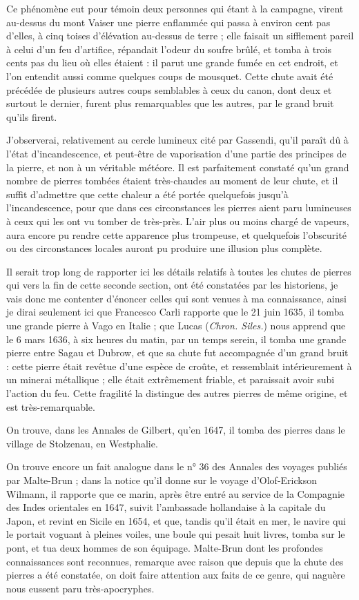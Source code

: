 \documentclass[a4paper, 12pt, oneside, french]{article}
\begin{document}
Ce phénomène eut pour témoin deux personnes qui étant à la campagne, virent au-dessus du mont Vaiser une pierre enflammée qui passa à environ cent pas d'elles, à cinq toises d'élévation au-dessus de terre ; elle faisait un sifflement pareil à celui d'un feu d'artifice, répandait l'odeur du soufre brûlé, et tomba à trois cents pas du lieu où elles étaient : il parut une grande fumée en cet endroit, et l'on entendit aussi comme quelques coups de mousquet. Cette chute avait été précédée de plusieurs autres coups semblables à ceux du canon, dont deux et surtout le dernier, furent plus remarquables que les autres, par le grand bruit qu'ils firent.

J'observerai, relativement au cercle lumineux cité par Gassendi, qu'il paraît dû à l'état d'incandescence, et peut-être de vaporisation d'une partie des principes de la pierre, et non à un véritable météore. Il est parfaitement constaté qu'un grand nombre de pierres tombées étaient très-chaudes au moment de leur chute, et il suffit d'admettre que cette chaleur a été portée quelquefois jusqu'à l'incandescence, pour que dans ces circonstances les pierres aient paru lumineuses à ceux qui les ont vu tomber de très-près. L'air plus ou moins chargé de vapeurs, aura encore pu rendre cette apparence plus trompeuse, et quelquefois l'obscurité ou des circonstances locales auront pu produire une illusion plus complète.

Il serait trop long de rapporter ici les détails relatifs à toutes les chutes de pierres qui vers la fin de cette seconde section, ont été constatées par les historiens, je vais donc me contenter d'énoncer celles qui sont venues à ma connaissance, ainsi je dirai seulement ici que Francesco Carli rapporte que le 21 juin 1635, il tomba une grande pierre à Vago en Italie ; que Lucas (\emph{Chron. Siles.}) nous apprend que le 6 mars 1636, à six heures du matin, par un temps serein, il tomba une grande pierre entre Sagau et Dubrow, et que sa chute fut accompagnée d'un grand bruit : cette pierre était revêtue d'une espèce de croûte, et ressemblait intérieurement à un minerai métallique ; elle était extrêmement friable, et paraissait avoir subi l'action du feu. Cette fragilité la distingue des autres pierres de même origine, et est très-remarquable.

On trouve, dans les Annales de Gilbert, qu'en 1647, il tomba des pierres dans le village de Stolzenau, en Westphalie.

On trouve encore un fait analogue dans le n° 36 des Annales des voyages publiés par Malte-Brun ; dans la notice qu'il donne sur le voyage d'Olof-Erickson Wilmann, il rapporte que ce marin, après être entré au service de la Compagnie des Indes orientales en 1647, suivit l'ambassade hollandaise à la capitale du Japon, et revint en Sicile en 1654, et que, tandis qu'il était en mer, le navire qui le portait voguant à pleines voiles, une boule qui pesait huit livres, tomba sur le pont, et tua deux hommes de son équipage. Malte-Brun dont les profondes connaissances sont reconnues, remarque avec raison que depuis que la chute des pierres a été constatée, on doit faire attention aux faits de ce genre, qui naguère nous eussent paru très-apocryphes.
\end{document}
